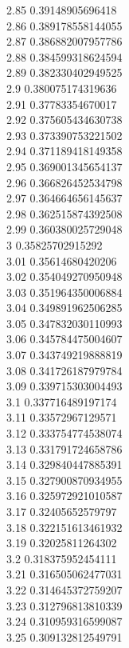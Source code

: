 {2.85	0.39148905696418\\
2.86	0.389178558144055\\
2.87	0.386882007957786\\
2.88	0.384599318624594\\
2.89	0.382330402949525\\
2.9	0.380075174319636\\
2.91	0.37783354670017\\
2.92	0.375605434630738\\
2.93	0.373390753221502\\
2.94	0.371189418149358\\
2.95	0.369001345654137\\
2.96	0.366826452534798\\
2.97	0.364664656145637\\
2.98	0.362515874392508\\
2.99	0.360380025729048\\
3	0.35825702915292\\
3.01	0.35614680420206\\
3.02	0.354049270950948\\
3.03	0.351964350006884\\
3.04	0.349891962506285\\
3.05	0.347832030110993\\
3.06	0.345784475004607\\
3.07	0.343749219888819\\
3.08	0.341726187979784\\
3.09	0.339715303004493\\
3.1	0.337716489197174\\
3.11	0.33572967129571\\
3.12	0.333754774538074\\
3.13	0.331791724658786\\
3.14	0.329840447885391\\
3.15	0.327900870934955\\
3.16	0.325972921010587\\
3.17	0.32405652579797\\
3.18	0.322151613461932\\
3.19	0.32025811264302\\
3.2	0.318375952454111\\
3.21	0.316505062477031\\
3.22	0.314645372759207\\
3.23	0.312796813810339\\
3.24	0.310959316599087\\
3.25	0.309132812549791\\
}
